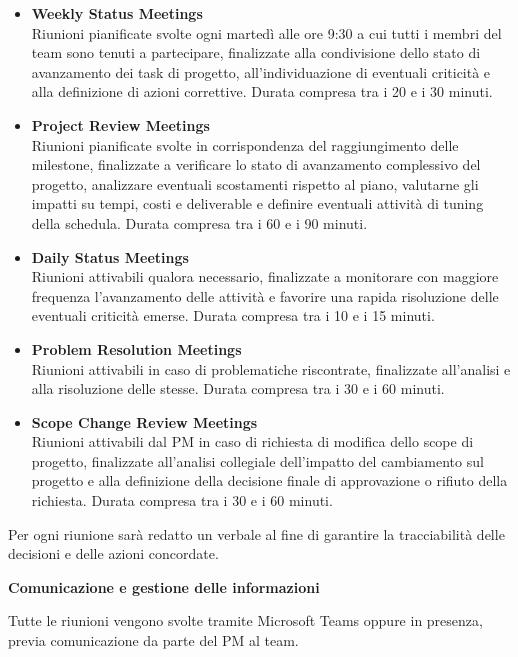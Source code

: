 \documentclass[11pt,a4paper]{article}
\begin{document}
\begin{itemize}[itemsep=4pt,topsep=4pt]
\item \textbf{Weekly Status Meetings}\\
Riunioni pianificate svolte ogni martedì alle ore 9:30 a cui tutti i membri del team sono tenuti a partecipare, finalizzate alla condivisione dello stato di avanzamento dei task di progetto, all’individuazione di eventuali criticità e alla definizione di azioni correttive. Durata compresa tra i 20 e i 30 minuti.
\item \textbf{Project Review Meetings}\\
Riunioni pianificate svolte in corrispondenza del raggiungimento delle milestone, finalizzate a verificare lo stato di avanzamento complessivo del progetto, analizzare eventuali scostamenti rispetto al piano, valutarne gli impatti su tempi, costi e deliverable e definire eventuali attività di tuning della schedula. Durata compresa tra i 60 e i 90 minuti.
\item \textbf{Daily Status Meetings}\\
Riunioni attivabili qualora necessario, finalizzate a monitorare con maggiore frequenza l’avanzamento delle attività e favorire una rapida risoluzione delle eventuali criticità emerse. Durata compresa tra i 10 e i 15 minuti.
\item \textbf{Problem Resolution Meetings}\\
Riunioni attivabili in caso di problematiche riscontrate, finalizzate all’analisi e alla risoluzione delle stesse. Durata compresa tra i 30 e i 60 minuti.
\item \textbf{Scope Change Review Meetings}\\
Riunioni attivabili dal PM in caso di richiesta di modifica dello scope di progetto, finalizzate all’analisi collegiale dell’impatto del cambiamento sul progetto e alla definizione della decisione finale di approvazione o rifiuto della richiesta. Durata compresa tra i 30 e i 60 minuti.
\end{itemize}

\smallskip Per ogni riunione sarà redatto un verbale al fine di garantire la tracciabilità delle decisioni e delle azioni concordate.

\medskip\noindent\textbf{Comunicazione e gestione delle informazioni}\par\smallskip

{Tutte le riunioni vengono svolte tramite Microsoft Teams oppure in presenza, previa comunicazione da parte del PM al team.}
\end{document}
